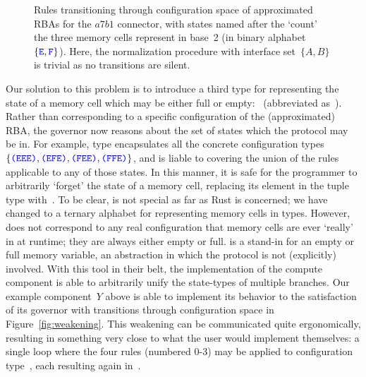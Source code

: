 \begin{figure}[ht]
	\centering
	\footnotesize
	\caption[Configuration space of the a7b1 connector.]{Rules transitioning through configuration space of approximated RBAs for the $a7b1$ connector, with states named after the `count' the three memory cells represent in base~2 (in binary alphabet $\{\text{\textcolor{blue}{\texttt{E}}}, \text{\textcolor{blue}{\texttt{F}}}\}$). Here, the normalization procedure with interface set~$\{A,B\}$ is trivial as no transitions are silent.}
	\label{fig:counter_RBAs}
\end{figure}

Our solution to this problem is to introduce a third type for representing the state of a memory cell which may be either full or empty:~ (abbreviated as~). Rather than corresponding to a specific configuration of the (approximated) RBA, the governor now reasons about the set of states which the protocol may be in. For example, type  encapsulates all the concrete configuration types $\{\text{\textcolor{blue}{\texttt{(EEE)}}}, \text{\textcolor{blue}{\texttt{(EFE)}}}, \text{\textcolor{blue}{\texttt{(FEE)}}}, \text{\textcolor{blue}{\texttt{(FFE)}}}\}$, and is liable to covering the union of the rules applicable to any of those states. In this manner, it is safe for the programmer to arbitrarily `forget' the state of a memory cell, replacing its element in the tuple type with~. To be clear,  is not special as far as Rust is concerned; we have changed to a ternary alphabet for representing memory cells in types. However,  does not correspond to any real configuration that memory cells are ever `really' in at runtime; they are always either empty or full.  is a stand-in for an empty or full memory variable, an abstraction in which the protocol is not (explicitly) involved.
With this tool in their belt, the implementation of the compute component is able to arbitrarily unify the state-types of multiple branches. Our example component~$Y$ above is able to implement its behavior to the satisfaction of its governor with transitions through configuration space in Figure~\ref{fig:weakening}. This weakening can be communicated quite ergonomically, resulting in something very close to what the user would implement themselves: a single loop where the four rules (numbered 0-3) may be applied to configuration type~, each resulting again in~.


